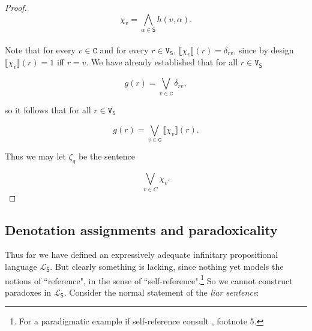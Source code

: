 \documentclass[12pt]{article}
\newtheorem{defn}{Definition}
\theoremstyle{remark}
\newcommand{\fancy}[1]{\mathcal{#1}}
\def\S{\textsf{S}}
\def\V{\texttt{V}}
\def\C{\texttt{C}}
\def\L{\fancy{L}}
\begin{document}
\begin{proof}
\[\chi_v = \bigwedge_{\alpha \in \S} h(v, \alpha).\]\\


Note that for every $v \in \C$ and for every $r \in \V_{\S}$,  $\llbracket \chi_v\rrbracket(r) = \delta_{rv}$, since by design $\llbracket \chi_v\rrbracket(r)  = 1$ iff $r = v$. We have already established that for all $r \in \V_{\S}$

\[g(r) = \bigvee_{v \in \C} \delta_{rv},\]

so it follows that for all $r \in \V_{\S}$

\[g(r) = \bigvee_{v \in \C} \llbracket \chi_v\rrbracket(r).\]

Thus we may let $\zeta_g$ be the sentence 

\[\bigvee_{v \in C} \chi_v.\]
\end{proof}

%
\begin{comment}
\begin{defn}
For $\gamma \in \S^+$ we define its \emph{normal form} $\zeta_{\gamma}$ as $\zeta_{\llbracket\gamma\rrbracket}$.
\end{defn}

In our proofs, we will often encounter sentences like $\phi \wedge \neg \phi$ which always have the same semantic value.  

\begin{defn}
A sentence $\gamma \in \S^+$ is \emph{constant} if $\zeta_{\gamma} \in \{\top, \bot\}$.  Note that if $\gamma$ is a constant sentence, then there is a $c(\gamma) \in \{0, 1\}$ such that $\gamma(v) = c(\gamma)$ for every truth-value assignment $v$ -- we call $c(\gamma)$ the \emph{value} of the contant sentence $\gamma$.  
\end{defn}

This propositional language lacks a truth (or falsity) predicate but this leaves nothing wanting in terms of characterizing the problematic reference structures.
\end{comment}
%

\subsection{Denotation assignments and paradoxicality} 

Thus far we have defined an expressively adequate infinitary propositional language $\L_\S$. But clearly something is lacking, since nothing yet models the notions of ``reference", in the sense of ``self-reference".\footnote{For a paradigmatic example if self-reference consult \cite{danger}, footnote 5.} So we cannot construct paradoxes in $\L_\S$. Consider the normal statement of the  \textit{liar sentence}:
\end{document}
